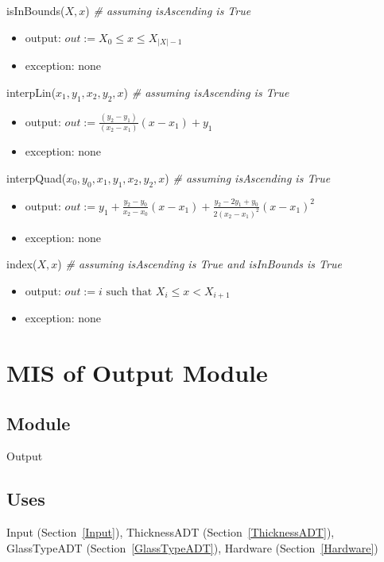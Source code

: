 \documentclass[12pt, titlepage]{article}
\begin{document}
\noindent isInBounds($X, x$) \textit{\# assuming isAscending is True}
\begin{itemize}
\item output: $out := X_0 \leq x \leq X_{|X|-1}$
\item exception: none
\end{itemize}

\noindent interpLin($x_1, y_1, x_2, y_2, x$) \textit{\# assuming isAscending is True}
\begin{itemize}
\item output: $out := \frac{(y_2 - y_1)}{(x_2-x_1)} (x - x_1) + y_1$
\item exception: none
\end{itemize}

\noindent interpQuad($x_0, y_0, x_1, y_1, x_2, y_2, x$) \textit{\# assuming isAscending is True}
\begin{itemize}
\item output: $out := y_1 + \frac{y_2 - y_0}{x_2-x_0} (x - x_1) + \frac{y_2 - 2 y_1 + y_0}{2
  (x_2-x_1)^2} (x - x_1)^2$
\item exception: none
\end{itemize}

\noindent index($X, x$) \textit{\# assuming isAscending is True and isInBounds is True}
\begin{itemize}
\item output: $out := i \mbox{ such that } X_i \leq x < X_{i+1}$
\item exception: none
\end{itemize}

\newpage


\section{MIS of Output Module} \label{Output}

\subsection {Module}

Output

\subsection {Uses}

Input (Section~\ref{Input}), ThicknessADT (Section~\ref{ThicknessADT}),
GlassTypeADT (Section~\ref{GlassTypeADT}), Hardware (Section~\ref{Hardware})
\end{document}
